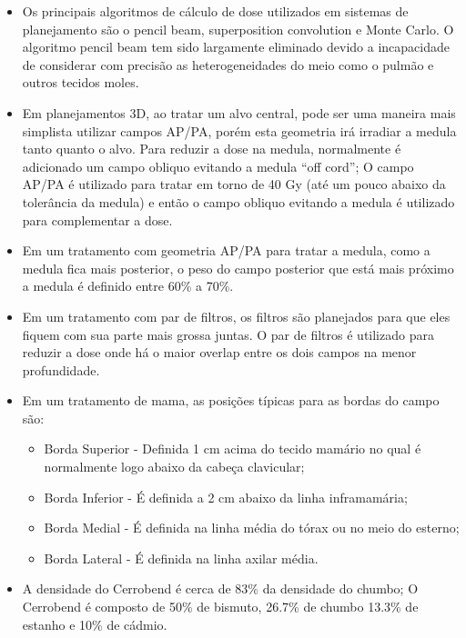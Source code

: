 \documentclass[11pt,a4paper]{article}
\newcounter{exemplo}
\begin{document}
\begin{exemplo}
\begin{itemize}
        \item Os principais algoritmos de cálculo de dose utilizados em sistemas de planejamento são o pencil beam, superposition convolution e Monte Carlo. O algoritmo pencil beam tem sido largamente eliminado devido a incapacidade de considerar com precisão as heterogeneidades do meio como o pulmão e outros tecidos moles.
        
        \item Em planejamentos 3D, ao tratar um alvo central, pode ser uma maneira mais simplista utilizar campos AP/PA, porém esta geometria irá irradiar a medula tanto quanto o alvo. Para reduzir a dose na medula, normalmente é adicionado um campo obliquo evitando a medula ``off cord''; O campo AP/PA é utilizado para tratar em torno de 40 Gy (até um pouco abaixo da tolerância da medula) e então o campo obliquo evitando a medula é utilizado para complementar a dose. 
        
        \item Em um tratamento com geometria AP/PA para tratar a medula, como a medula fica mais posterior, o peso do campo posterior que está mais próximo a medula é definido entre 60\% a 70\%.
        
        \item Em um tratamento com par de filtros, os filtros são planejados para que eles fiquem com sua parte mais grossa juntas. O par de filtros é utilizado para reduzir a dose onde há o maior overlap entre os dois campos na menor profundidade.
        
        \item Em um tratamento de mama, as posições típicas para as bordas do campo são:
        
            \begin{itemize}[label=\textopenbullet]
                \item Borda Superior - Definida 1 cm acima do tecido mamário no qual é normalmente logo abaixo da cabeça clavicular;
                \item  Borda Inferior - É definida a 2 cm abaixo da linha inframamária;
                \item  Borda Medial - É definida na linha média do tórax ou no meio do esterno;
                \item Borda Lateral - É definida na linha axilar média. 
            \end{itemize}
        
        \item A densidade do Cerrobend é cerca de 83\% da densidade do chumbo; O Cerrobend é composto de 50\% de bismuto, 26.7\% de chumbo 13.3\% de estanho e 10\% de cádmio. 
        

\end{itemize}
\end{exemplo}
\end{document}
